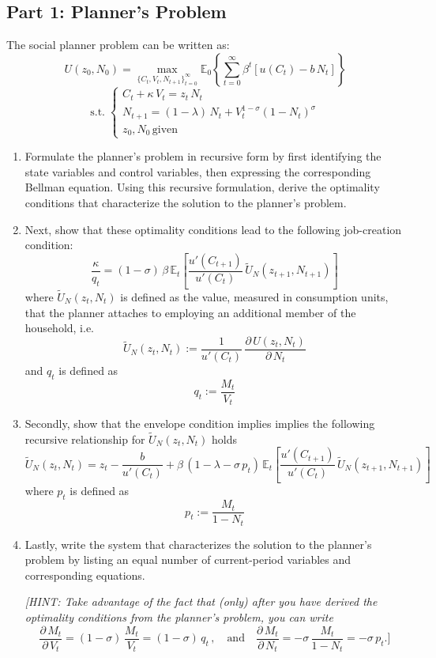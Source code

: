 \documentclass[a4paper,11pt]{article}
\begin{document}
\subsection*{Part 1: Planner's Problem}
The social planner problem can  be written as:
$$ U(z_0,N_0) = \max_{\{C_t,V_t,N_{t+1}\}_{t=0}^\infty}\mathbb{E}_0\left\{\sum_{t=0}^\infty \beta^t \left[u(C_t) - b\,N_t\right]\right\} $$
$$ \mathrm{s.t.}\; 
\begin{cases}
C_t + \kappa\,V_t = z_t\,N_t 	\\
N_{t+1} = (1-\lambda)\,N_t + V_t^{1-\sigma}(1-N_t)^\sigma	\\
z_0,N_0\,\text{given}
\end{cases}
$$\begin{enumerate}
\item Formulate the planner's problem in recursive form by first identifying the state variables and control variables, then expressing the corresponding Bellman equation. Using this recursive formulation, derive the optimality conditions that characterize the solution to the planner's problem.

\item Next, show that these optimality conditions lead to the following job-creation condition:
$$ \frac{\kappa}{q_t} = (1-\sigma) \, \beta\,\mathbb{E}_t\left[\frac{u'(C_{t+1})}{u'(C_t)}\, \widetilde{U}_N(z_{t+1},N_{t+1})\right] $$
where $\widetilde{U}_N(z_{t},N_{t})$ is defined as the value, measured in consumption units, that the planner attaches to employing an additional member of the household, i.e.
$$ \widetilde{U}_N(z_{t},N_{t}) := \frac{1}{u'(C_t)}\,\frac{\partial\,U(z_{t},N_{t})}{\partial\,N_t} $$
and $q_t$ is defined as
$$ q_t := \frac{M_t}{V_t} $$

\item Secondly, show that the envelope condition implies implies the following recursive relationship for $ \widetilde{U}_N(z_{t},N_{t})$ holds
$$
\widetilde{U}_N(z_{t},N_{t})
    = z_t - \frac{b}{u'(C_t)} + \beta\,\left(1-\lambda - \sigma\,p_t\right)\,\mathbb{E}_t\left[\frac{u'(C_{t+1})}{u'(C_t)}\, \widetilde{U}_N(z_{t+1},N_{t+1})\right]
$$
where $p_t$ is defined as
$$ p_t := \frac{M_t}{1-N_t} $$

\item Lastly, write the system that characterizes the solution to the planner's problem by listing an equal number of current-period variables and corresponding equations.

\textit{[HINT: Take advantage of the fact that (only) after you have derived the optimality conditions from the planner's problem, you can write
$$ \frac{\partial\,M_t}{\partial\,V_t} = (1-\sigma)\,\frac{M_t}{V_t} = (1-\sigma)\,q_t\,,\quad\text{and}\quad \frac{\partial\,M_t}{\partial\,N_t} = -\sigma\,\frac{M_t}{1 - N_t} = - \sigma\,p_t.]$$}


\end{enumerate}
\end{document}
